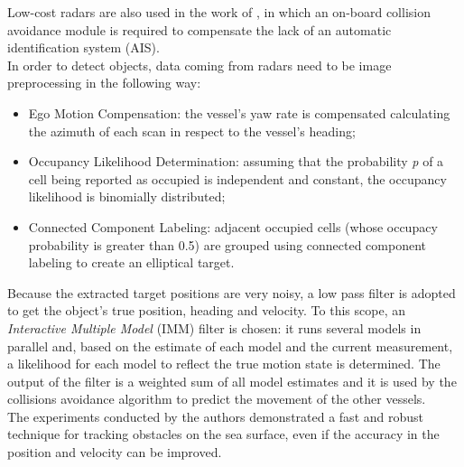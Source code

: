 \documentclass[12pt]{article}
\begin{document}
      \indent Low-cost radars are also used in the work of \textcite{Schuster2014}, in which an on-board collision avoidance module is required to compensate the lack of an automatic identification system (AIS).\\
      \indent In order to detect objects, data coming from radars need to be image preprocessing in the following way:
            \begin{itemize}
                  \item Ego Motion Compensation: the vessel's yaw rate is compensated calculating the azimuth of each scan in respect to the vessel's heading;
                  \item Occupancy Likelihood Determination: assuming that the probability \textit{p} of a cell being reported as occupied is independent and constant, the occupancy likelihood is binomially distributed;
                  \item Connected Component Labeling: adjacent occupied cells (whose occupacy probability is greater than 0.5) are grouped using connected component labeling \parencite{Gonzalez:2001:DIP:559707} to create an elliptical target.
            \end{itemize}
      Because the extracted target positions are very noisy, a low pass filter is adopted to get the object's true position, heading and velocity. To this scope, an \textit{Interactive Multiple Model} (IMM) filter is chosen: it runs several models in parallel and, based on the estimate of each model and the current measurement, a likelihood for each model to reflect the true motion state is determined. The output of the filter is a weighted sum of all model estimates and it is used by the collisions avoidance algorithm to predict the movement of the other vessels.\\
      The experiments conducted by the authors demonstrated a fast and robust technique for tracking obstacles on the sea surface, even if the accuracy in the position and velocity can be improved.
\end{document}
